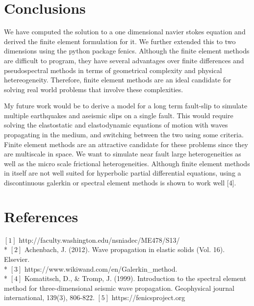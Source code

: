 \documentclass{article}
\begin{document}
\section{Conclusions}
We have computed the solution to a one dimensional navier stokes equation and derived the finite element formulation for it. We further extended this to two dimensions using the python package fenics. Although the finite element methods are difficult to program, they have several advantages over finite differences and pseudospectral methods in terms of geometrical complexity and physical hetereogeneity. Therefore, finite element methods are an ideal candidate for solving real world problems that involve these complexities. 

My future work would be to derive a model for a long term fault-slip to simulate multiple earthquakes and aseismic slips on a single fault. This would require solving the elastostatic and elastodynamic equations of motion with waves propagating in the medium, and switching between the two using some criteria. Finite element methods are an attractive candidate for these problems since they are multiscale in space. We want to simulate near fault large heterogeneities as well as the micro scale frictional heterogeneities. Although finite element methods in itself are not well suited for hyperbolic partial differential equations, using a discontinuous galerkin or spectral element methods is shown to work well [4].

\section{References}
$[1]$ http://faculty.washington.edu/nsniadec/ME478/S13/ \\* 
$[2]$ Achenbach, J. (2012). Wave propagation in elastic solids (Vol. 16). Elsevier.\\*
$[3]$ https://www.wikiwand.com/en/Galerkin\_method. \\*
$[4]$ Komatitsch, D., & Tromp, J. (1999). Introduction to the spectral element method for three-dimensional seismic wave propagation. Geophysical journal international, 139(3), 806-822.
$[5]$ https://fenicsproject.org
\end{document}
